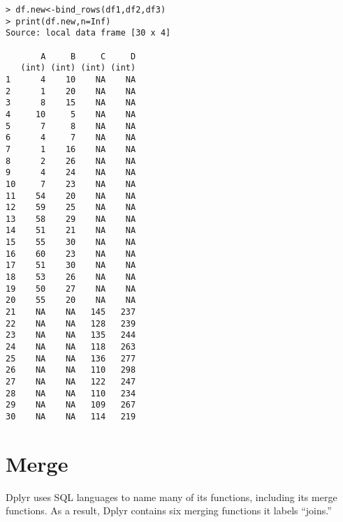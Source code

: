 \documentclass[12pt, oneside]{amsart}   	%
\begin{document}
\begin{verbatim}
> df.new<-bind_rows(df1,df2,df3)
> print(df.new,n=Inf)
Source: local data frame [30 x 4]

       A     B     C     D
   (int) (int) (int) (int)
1      4    10    NA    NA
2      1    20    NA    NA
3      8    15    NA    NA
4     10     5    NA    NA
5      7     8    NA    NA
6      4     7    NA    NA
7      1    16    NA    NA
8      2    26    NA    NA
9      4    24    NA    NA
10     7    23    NA    NA
11    54    20    NA    NA
12    59    25    NA    NA
13    58    29    NA    NA
14    51    21    NA    NA
15    55    30    NA    NA
16    60    23    NA    NA
17    51    30    NA    NA
18    53    26    NA    NA
19    50    27    NA    NA
20    55    20    NA    NA
21    NA    NA   145   237
22    NA    NA   128   239
23    NA    NA   135   244
24    NA    NA   118   263
25    NA    NA   136   277
26    NA    NA   110   298
27    NA    NA   122   247
28    NA    NA   110   234
29    NA    NA   109   267
30    NA    NA   114   219
\end{verbatim}

\section{Merge}

Dplyr uses SQL languages to name many of its functions, including its merge functions. As a result, Dplyr contains six merging functions it labels ``joins.'' 
\end{document}
